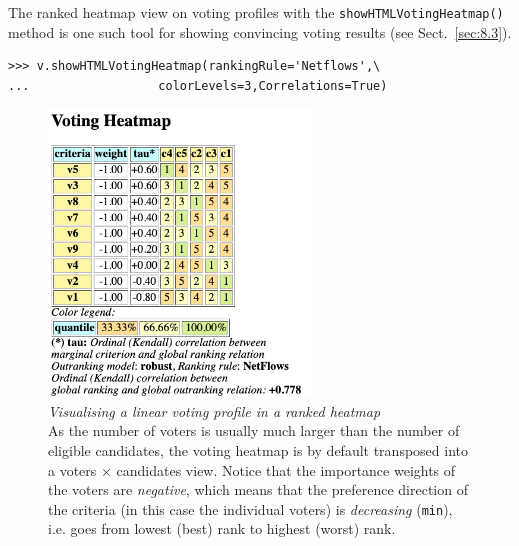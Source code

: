 The \NetFlows ranked heatmap view on voting profiles with the \texttt{showHTML\-VotingHeatmap()} method is one such tool for showing convincing voting results (see Sect.~\ref{sec:8.3}).
\begin{lstlisting}[caption={\NetFlows ranked heatmap view on a voting profile},label=list:7.8]
>>> v.showHTMLVotingHeatmap(rankingRule='Netflows',\
...                  colorLevels=3,Correlations=True)
\end{lstlisting}
\begin{figure}[ht]
\sidecaption[t]
\includegraphics[width=7cm]{Figures/7-3-votingHeatmap.png}
\caption[Visualising a linear voting profile in a \NetFlows ranked heatmap]{\emph{Visualising a linear voting profile in a \NetFlows ranked heatmap}\\ As the number of voters is usually much larger than the number of eligible candidates, the voting heatmap is by default transposed into a voters $\times$ candidates view. Notice that the importance weights of the voters are \emph{negative}, which means that the preference direction of the criteria (in this case the individual voters) is \emph{decreasing} (\texttt{min}), i.e. goes from lowest (best) rank to highest (worst) rank.}
\label{fig:7.3}       %
\end{figure}

